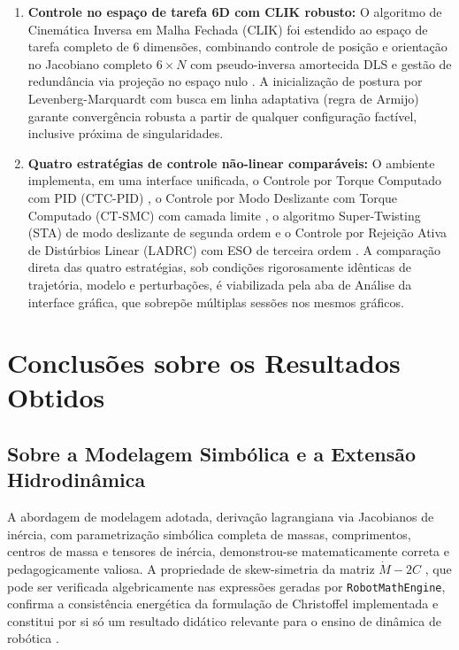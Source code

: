 \begin{enumerate}
    \item \textbf{Controle no espaço de tarefa 6D com CLIK robusto:} O algoritmo de Cinemática Inversa em Malha Fechada (CLIK) \cite{samson1991robot, chiaverini1994review} foi estendido ao espaço de tarefa completo de 6 dimensões, combinando controle de posição e orientação no Jacobiano completo $6 \times N$ com pseudo-inversa amortecida DLS \cite{nakamura1986inverse, wampler2007manipulator} e gestão de redundância via projeção no espaço nulo \cite{chiaverini1997singularity, liegeois1977automatic}. A inicialização de postura por Levenberg-Marquardt com busca em linha adaptativa (regra de Armijo) \cite{marquardt1963algorithm, more2006levenberg, armijo1966minimization} garante convergência robusta a partir de qualquer configuração factível, inclusive próxima de singularidades.

    \item \textbf{Quatro estratégias de controle não-linear comparáveis:} O ambiente implementa, em uma interface unificada, o Controle por Torque Computado com PID (CTC-PID) \cite{craig1989introduction, spong2020robot}, o Controle por Modo Deslizante com Torque Computado (CT-SMC) com camada limite \cite{slotine1991applied, burton1986continuous}, o algoritmo Super-Twisting (STA) de modo deslizante de segunda ordem \cite{levant1993sliding, moreno2012strict} e o Controle por Rejeição Ativa de Distúrbios Linear (LADRC) com ESO de terceira ordem \cite{gao2003scaling, han2009pid, huang2014active}. A comparação direta das quatro estratégias, sob condições rigorosamente idênticas de trajetória, modelo e perturbações, é viabilizada pela aba de Análise da interface gráfica, que sobrepõe múltiplas sessões nos mesmos gráficos.
\end{enumerate}

\section{Conclusões sobre os Resultados Obtidos}

\subsection{Sobre a Modelagem Simbólica e a Extensão Hidrodinâmica}

A abordagem de modelagem adotada, derivação lagrangiana via Jacobianos de inércia, com parametrização simbólica completa de massas, comprimentos, centros de massa e tensores de inércia, demonstrou-se matematicamente correta e pedagogicamente valiosa. A propriedade de skew-simetria da matriz $\dot{M} - 2C$ \cite{spong2020robot, siciliano2009robotics}, que pode ser verificada algebricamente nas expressões geradas por \texttt{RobotMathEngine}, confirma a consistência energética da formulação de Christoffel implementada e constitui por si só um resultado didático relevante para o ensino de dinâmica de robótica \cite{tomei2002simple, slotine1987adaptive}.

